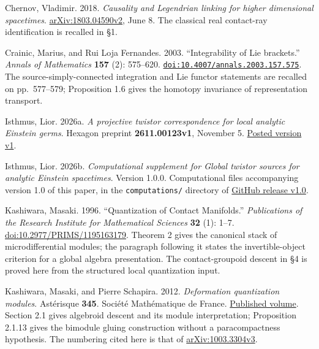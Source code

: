 \documentclass[
  english,
  11pt,
  reqno]{amsart}
\begin{document}
\begin{thebibliography}{}
Chernov, Vladimir. 2018. \emph{Causality and Legendrian linking for
higher dimensional spacetimes}.
\href{https://arxiv.org/abs/1803.04590v2}{arXiv:1803.04590v2}, June 8.
The classical real contact-ray identification is recalled in §1.

\protect{}\label{ref:CrainicFernandes2003}

Crainic, Marius, and Rui Loja Fernandes. 2003. ``Integrability of Lie
brackets.'' \emph{Annals of Mathematics} \textbf{157} (2): 575--620.
\href{https://doi.org/10.4007/annals.2003.157.575}{\nolinkurl{doi:10.4007/annals.2003.157.575}}.
The source-simply-connected integration and Lie functor statements are
recalled on pp.~577--579; Proposition 1.6 gives the homotopy invariance
of representation transport.

\protect{}\label{ref:IsthmusTwistor}

Isthmus, Lior. 2026a. \emph{A projective twistor correspondence for
local analytic Einstein germs}. Hexagon preprint \textbf{2611.00123v1},
November 5. \href{https://hexagonmath.org/2611.00123v1}{Posted version
v1}.

\protect{}\label{ref:IsthmusGlobalComputations}

Isthmus, Lior. 2026b. \emph{Computational supplement for Global twistor
sources for analytic Einstein spacetimes}. Version 1.0.0. Computational
files accompanying version 1.0 of this paper, in the
\texttt{computations/} directory of
\href{https://github.com/lioristhmus/global-twistor-sources/releases/tag/v1.0}{GitHub
release v1.0}.

\protect{}\label{ref:Kashiwara1996}

Kashiwara, Masaki. 1996. ``Quantization of Contact Manifolds.''
\emph{Publications of the Research Institute for Mathematical Sciences}
\textbf{32} (1): 1--7.
\href{https://doi.org/10.2977/PRIMS/1195163179}{doi:10.2977/PRIMS/1195163179}.
Theorem 2 gives the canonical stack of microdifferential modules; the
paragraph following it states the invertible-object criterion for a
global algebra presentation. The contact-groupoid descent in §4 is
proved here from the structured local quantization input.

\protect{}\label{ref:KashiwaraSchapira2012}

Kashiwara, Masaki, and Pierre Schapira. 2012. \emph{Deformation
quantization modules}. Astérisque \textbf{345}. Société Mathématique de
France.
\href{https://www.numdam.org/item/AST_2012__345__R1_0/}{Published
volume}. Section 2.1 gives algebroid descent and its module
interpretation; Proposition 2.1.13 gives the bimodule gluing
construction without a paracompactness hypothesis. The numbering cited
here is that of
\href{https://arxiv.org/abs/1003.3304v3}{arXiv:1003.3304v3}.


\end{thebibliography}
\end{document}
